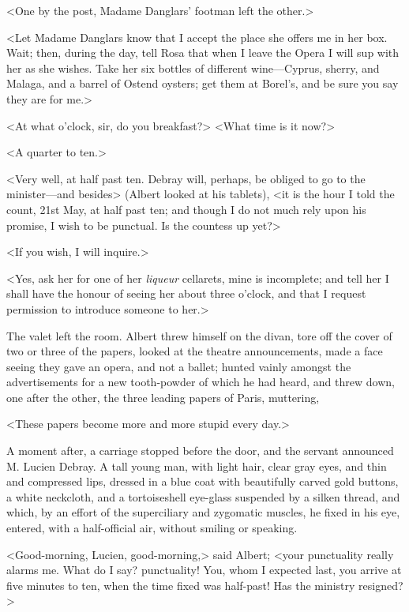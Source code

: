  <One by the post, Madame Danglars' footman left the other.> 

 <Let Madame Danglars know that I accept the place she offers me in her box. Wait; then, during the day, tell Rosa that when I leave the Opera I will sup with her as she wishes. Take her six bottles of different wine—Cyprus, sherry, and Malaga, and a barrel of Ostend oysters; get them at Borel's, and be sure you say they are for me.> 

 <At what o'clock, sir, do you breakfast?>  <What time is it now?> 

 <A quarter to ten.> 

 <Very well, at half past ten. Debray will, perhaps, be obliged to go to the minister—and besides> (Albert looked at his tablets), <it is the hour I told the count, 21st May, at half past ten; and though I do not much rely upon his promise, I wish to be punctual. Is the countess up yet?> 

 <If you wish, I will inquire.> 

 <Yes, ask her for one of her \textit{liqueur} cellarets, mine is incomplete; and tell her I shall have the honour of seeing her about three o'clock, and that I request permission to introduce someone to her.> 

 The valet left the room. Albert threw himself on the divan, tore off the cover of two or three of the papers, looked at the theatre announcements, made a face seeing they gave an opera, and not a ballet; hunted vainly amongst the advertisements for a new tooth-powder of which he had heard, and threw down, one after the other, the three leading papers of Paris, muttering, 

 <These papers become more and more stupid every day.> 

 A moment after, a carriage stopped before the door, and the servant announced M. Lucien Debray. A tall young man, with light hair, clear gray eyes, and thin and compressed lips, dressed in a blue coat with beautifully carved gold buttons, a white neckcloth, and a tortoiseshell eye-glass suspended by a silken thread, and which, by an effort of the superciliary and zygomatic muscles, he fixed in his eye, entered, with a half-official air, without smiling or speaking. 

 <Good-morning, Lucien, good-morning,> said Albert; <your punctuality really alarms me. What do I say? punctuality! You, whom I expected last, you arrive at five minutes to ten, when the time fixed was half-past! Has the ministry resigned?> 


